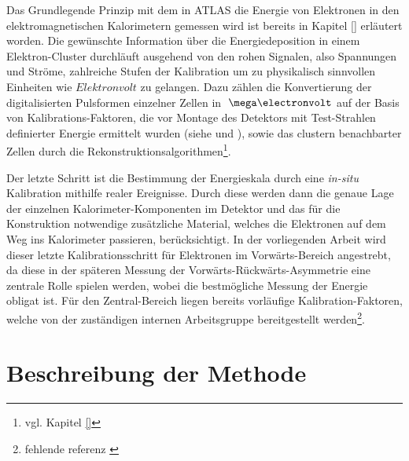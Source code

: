 
Das Grundlegende Prinzip mit dem in ATLAS die Energie von Elektronen in den
elektromagnetischen Kalorimetern gemessen wird ist bereits in Kapitel \ref{}
erläutert worden. Die gewünschte Information über die Energiedeposition in
einem Elektron-Cluster durchläuft ausgehend von den rohen Signalen, also
Spannungen und Ströme, zahlreiche Stufen der Kalibration um zu physikalisch
sinnvollen Einheiten wie $Elektronvolt$ zu gelangen. Dazu zählen die
Konvertierung der digitalisierten Pulsformen einzelner Zellen in $\MeV$ auf der
Basis von Kalibrations-Faktoren, die vor Montage des Detektors mit
Test-Strahlen definierter Energie ermittelt wurden (siehe \cite{Aleksa:942528}
und \cite{1748-0221-3-02-P02002}), sowie das clustern benachbarter Zellen durch
die Rekonstruktionsalgorithmen\footnote{vgl. Kapitel \ref{}}.

Der letzte Schritt ist die Bestimmung der Energieskala durch eine
\textit{in-situ} Kalibration mithilfe realer Ereignisse. Durch diese werden
dann die genaue Lage der einzelnen Kalorimeter-Komponenten im Detektor und das
für die Konstruktion notwendige zusätzliche Material, welches die Elektronen
auf dem Weg ins Kalorimeter passieren, berücksichtigt. In der vorliegenden
Arbeit wird dieser letzte Kalibrationsschritt für Elektronen im
Vorwärts-Bereich angestrebt, da diese in der späteren Messung der
Vorwärts-Rückwärts-Asymmetrie eine zentrale Rolle spielen werden, wobei die
bestmögliche Messung der Energie obligat ist. Für den Zentral-Bereich liegen
bereits vorläufige Kalibration-Faktoren, welche von der zuständigen internen
Arbeitsgruppe bereitgestellt werden\footnote{fehlende referenz \cite{}}.



%
\section{Beschreibung der Methode}
\label{energy_calibration:beschreibung_der_methode}

